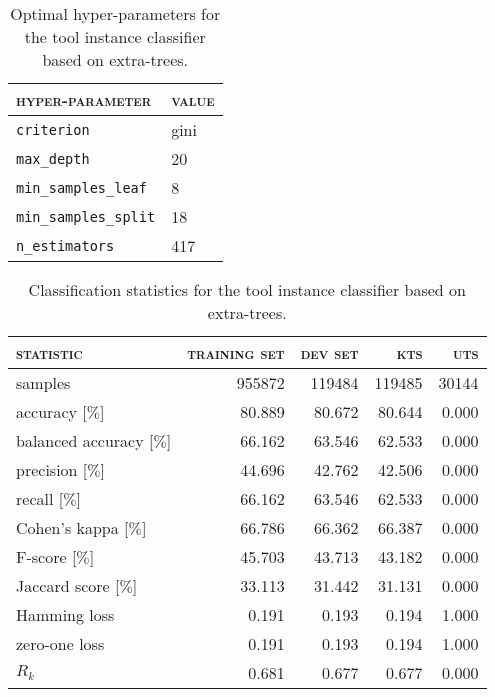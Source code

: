 \begin{table}[H]
	\centering
	\begin{tabular}{ll}
		\toprule
		\textsc{hyper-parameter} & \textsc{value}\\
		\midrule
		\verb|criterion| & gini\\
		\verb|max_depth| & 20\\
		\verb|min_samples_leaf| & 8\\
		\verb|min_samples_split| & 18\\
		\verb|n_estimators| & 417\\
		\bottomrule
	\end{tabular}
	\caption{Optimal hyper-parameters for the tool instance classifier based on extra-trees.}
	\label{tab:hyperparameters_application_long_extra_trees}
\end{table}
\begin{table}[H]
	\centering
	\begin{tabular}{lrrrr}
		\toprule
		\textsc{statistic} & \textsc{training set} & \textsc{dev set} & \textsc{kts} & \textsc{uts}\\
		\midrule
		samples & 955872 & 119484 & 119485 & 30144\\
		accuracy [$\%$] & 80.889 & 80.672 & 80.644 & 0.000\\
		balanced accuracy [$\%$] & 66.162 & 63.546 & 62.533 & 0.000\\
		precision [$\%$] & 44.696 & 42.762 & 42.506 & 0.000\\
		recall [$\%$] & 66.162 & 63.546 & 62.533 & 0.000\\
		Cohen’s kappa [$\%$] & 66.786 & 66.362 & 66.387 & 0.000\\
		F-score [$\%$] & 45.703 & 43.713 & 43.182 & 0.000\\
		Jaccard score [$\%$] & 33.113 & 31.442 & 31.131 & 0.000\\
		Hamming loss & 0.191 & 0.193 & 0.194 & 1.000\\
		zero-one loss & 0.191 & 0.193 & 0.194 & 1.000\\
		$R_k$ & 0.681 & 0.677 & 0.677 & 0.000\\
		\bottomrule
	\end{tabular}
	\caption{Classification statistics for the tool instance classifier based on extra-trees.}
	\label{tab:classification_application_long_extra_trees}
\end{table}
